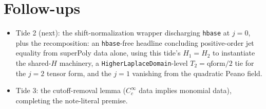 \documentclass[11pt]{article}
\begin{document}
\section{Follow-ups}

\begin{itemize}[nosep]
\item Tide 2 (next): the shift-normalization wrapper discharging
\texttt{hbase} at $j = 0$, plus the recomposition: an \texttt{hbase}-free
headline concluding positive-order jet equality from superPoly data alone,
using this tide's $H_1 = H_2$ to instantiate the shared-$H$ machinery, a
\texttt{HigherLaplaceDomain}-level $T_2 = \mathrm{qform}/2$ tie for the
$j=2$ tensor form, and the $j=1$ vanishing from the quadratic Peano field.
\item Tide 3: the cutoff-removal lemma ($C_c^\infty$ data implies monomial
data), completing the note-literal premise.
\end{itemize}
\end{document}
